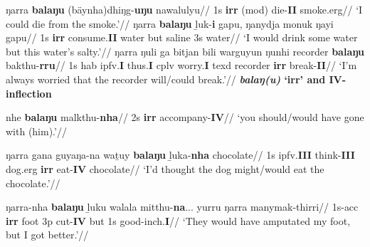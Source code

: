 \a\begingl\gla ŋarra \textbf{balaŋu} (bäynha)\footnotemark dhiŋg-\textbf{uŋu} nawalulyu//
\glb 1s \textbf{\gls{irr}} (\gls{mod}) die-\textbf{II} smoke.\gls{erg}//
\glft`I could die from the smoke.'\trailingcitation{[DG~20190405]}//\endgl
\a\begingl\gla ŋarra \textbf{balaŋu} ḻuk-\textbf{i} gapu, ŋanydja monuk ŋayi gapu//
\glb 1s \textbf{\gls{irr}} consume.\textbf{II} water but saline 3s water//
\glft`I would drink some water but this water's salty.'\trailingcitation{[DG~20190405]}//\endgl
\a\begingl\gla ŋarra ŋuli ga bitjan bili warguyun ŋunhi recorder \textbf{balaŋu} bakthu-\textbf{rru}//
\glb 1s \gls{hab} \gls{ipfv}.\textbf{I} thus.\textbf{I} \gls{cplv} worry.\textbf{I} \gls{texd} recorder \textbf{\gls{irr}} break-\textbf{II}// 
\glft`I'm always worried that the recorder will/could break.'\trailingcitation{[DG~20190417]}//\endgl
\xe
{}
\pex \textbf{\textit{balaŋ(u)} `\gls{irr}' and \textbf{IV}-inflection}

\a\begingl\gla nhe \textbf{balaŋu} malkthu-\textbf{nha}//
\glb 2s \textbf{\gls{irr}} accompany-\textbf{IV}//
\glft `you should/would have gone with (him).'\trailingcitation{[DG~20190413]}//\endgl


\a\begingl\gla ŋarra gana guyaŋa-na waṯuy \textbf{balaŋu} ḻuka-\textbf{nha} chocolate//
\glb 1s \gls{ipfv}.\textbf{III} think-\textbf{III} dog.\gls{erg} \textbf{\gls{irr}} eat-\textbf{IV} chocolate//
\glft`I'd thought the dog might/would eat the chocolate.'\trailingcitation{[DG~20190413]}//\endgl

\a\begingl\gla ŋarra-nha \textbf{balaŋu} ḻuku walala mitthu-\textbf{na}... yurru ŋarra manymak-thirri//
\glb 1s-\gls{acc} \textbf{\gls{irr}} foot 3p cut-\textbf{IV} but 1s good-\gls{inch}.\textbf{I}//
\glft`They would have amputated my foot, but I got better.'\trailingcitation{[DG~20190417]}//\endgl
\xe
{}

